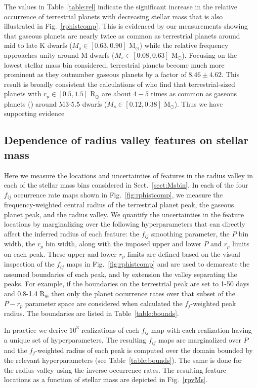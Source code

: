 \documentclass[twocolumn]{emulateapj}
\begin{document}


The values in Table~\ref{table:rel} indicate the significant increase in the relative occurrence of terrestrial
planets with decreasing stellar mass that is also illustrated in Fig.~\ref{rphistcomp}. This is evidenced by
our measurements showing that gaseous planets are nearly twice as common as terrestrial planets
around mid to late K dwarfs ($M_s \in [0.63,0.90]$ M$_{\odot}$) while the relative frequency approaches unity
around M dwarfs ($M_s \in [0.08,0.63]$ M$_{\odot}$). Focusing on the lowest stellar mass bin considered,
terrestrial planets become much more prominent as they outnumber gaseous planets by a factor of
$8.46\pm 4.62$. This result is broadly
consistent the calculations of \cite{hardegree19} who find that terrestrial-sized 
planets with $r_p \in[0.5,1.5]$ R$_{\oplus}$ are about $4-5$ times as common as gaseous planets ()
around M3-5.5 dwarfs ($M_s \in [0.12,0.38]$ M$_{\odot}$). Thus we have supporting evidence 

\subsection{Dependence of radius valley features on stellar mass}
Here we measure the locations and uncertainties of features in the radius valley in each of the stellar
mass bins considered in Sect.~\ref{sect:Msbin}. In each of the four $f_{ij}$ occurrence rate maps shown
in Fig.~\ref{fig:rphistcomp}, we measure the frequency-weighted central radius of the terrestrial planet peak,
the gaseous planet peak, and the radius valley. We quantify the uncertainties in the feature locations by
marginalizing over the following hyperparameters that can directly affect the inferred radius of each feature:
the $f_{ij}$ smoothing parameter, the $P$ bin width, the $r_p$ bin width, along with the imposed upper and
lower $P$ and $r_p$ limits on each peak. These upper and lower $r_p$ limits are defined based on the visual
inspection of the $f_{ij}$ maps in Fig.~\ref{fig:rphistcomp} and are used to demarcate the assumed
boundaries of each peak, and by extension the valley separating the peaks.
For example, if the boundaries on the terrestrial peak are set to 1-50 days and 0.8-1.4 R$_{\oplus}$ then only
the planet occurrence rates over that subset of the $P-r_p$ parameter space are considered when calculated the
$f_j$-weighted peak radius. The boundaries are listed in Table~\ref{table:bounds}.

In practice we derive $10^3$ realizations of each $f_{ij}$ map with each realization having a unique set of
hyperparameters. The resulting $f_{ij}$ maps are marginalized over $P$ and the $f_j$-weighted radius of
each peak is computed over the domain bounded by the relevant hyperparameters (see Table~\ref{table:bounds}).
The same is done for the radius valley using the inverse occurrence rates.
The resulting feature locations as a function of stellar mass are depicted in Fig.~\ref{rpvMs}.
\end{document}

